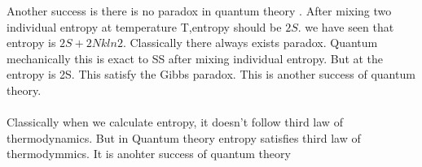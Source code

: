 \documentclass{article}
\newcommand*{\1}{\hspace{1pt}}
\begin{document}
Another success is there is no paradox in quantum theory . After mixing two individual entropy at temperature T,entropy should be $2S$. we have seen that entropy is $2S+2Nkln2$. Classically there always exists paradox. Quantum mechanically this is exact to SS after mixing individual entropy. 
But at  the entropy is 2S. This satisfy the Gibbs paradox. This is another success of quantum theory. \\ 
\\ 
Classically when we calculate entropy, it doesn't follow third law of thermodynamics. But in Quantum theory entropy satisfies third law of thermodymmics. It is anohter success of quantum theory


\newpage



\end{document}
